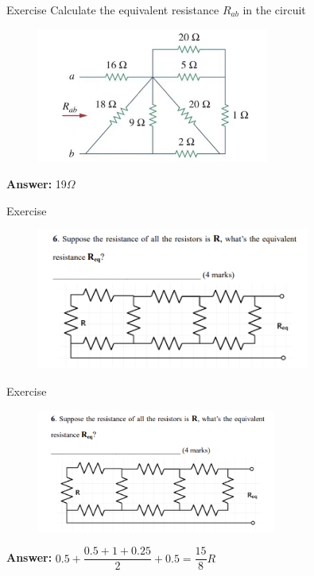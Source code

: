 \documentclass{beamer}
\begin{document}
\begin{frame}{Exercise}
Calculate the equivalent resistance $R_{ab}$ in the circuit
\begin{figure}
\centering
\includegraphics[width=3in]{32.jpg}
\end{figure}

\textbf{Answer:} 19$\Omega$
\end{frame}
\begin{frame}{Exercise}
\begin{figure}
\centering
\includegraphics[width=0.8\textwidth]{Ex2.png}
\end{figure}
\end{frame}

\begin{frame}{Exercise}
\begin{figure}
\centering
\includegraphics[width=0.7\textwidth]{Ex2.png}
\end{figure}
\centerline{\textbf{Answer:} $0.5+\dfrac{0.5+1+0.25}{2}+0.5=\dfrac{15}{8}R$}
\end{frame}
\end{document}
